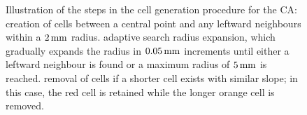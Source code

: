 \begin{figure}
\centering
{}
\caption[Illustration of the cell generation procedure in the CA algorithm]{\label{fig:cellularautomaton_cellgen}Illustration of the steps in the cell generation procedure for the \ac{CA}:\newline {} creation of cells between a central point and any leftward neighbours within a $2\,\mathrm{mm}$ radius.  adaptive search radius expansion, which gradually expands the radius in $0.05\,\mathrm{mm}$ increments until either a leftward neighbour is found or a maximum radius of $5\,\mathrm{mm}$ is reached.  removal of cells if a shorter cell exists with similar slope; in this case, the red cell is retained while the longer orange cell is removed.}
\end{figure}

